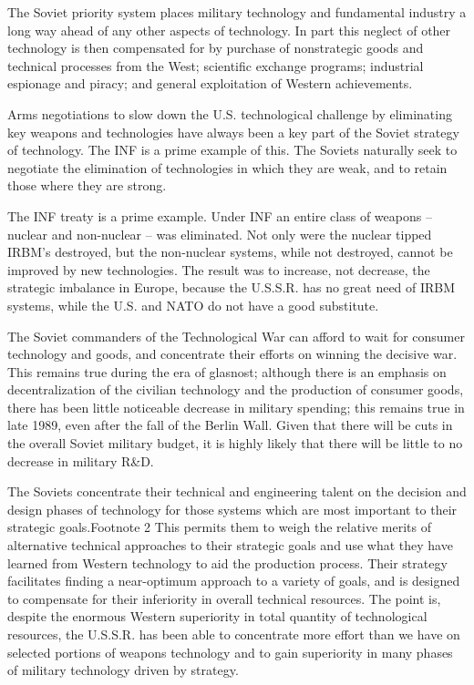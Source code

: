 The Soviet priority system places military technology and fundamental industry a long way ahead of any other aspects of technology. In part this neglect of other technology is then compensated for by purchase of nonstrategic goods and technical processes from the West; scientific exchange programs; industrial espionage and piracy; and general exploitation of Western achievements.

Arms negotiations to slow down the U.S. technological challenge by eliminating key weapons and technologies have always been a key part of the Soviet strategy of technology. The INF is a prime example of this. The Soviets naturally seek to negotiate the elimination of technologies in which they are weak, and to retain those where they are strong.

The INF treaty is a prime example. Under INF an entire class of weapons -- nuclear and non-nuclear -- was eliminated. Not only were the nuclear tipped IRBM's destroyed, but the non-nuclear systems, while not destroyed, cannot be improved by new technologies. The result was to increase, not decrease, the strategic imbalance in Europe, because the U.S.S.R. has no great need of IRBM systems, while the U.S. and NATO do not have a good substitute.

The Soviet commanders of the Technological War can afford to wait for consumer technology and goods, and concentrate their efforts on winning the decisive war. This remains true during the era of glasnost; although there is an emphasis on decentralization of the civilian technology and the production of consumer goods, there has been little noticeable decrease in military spending; this remains true in late 1989, even after the fall of the Berlin Wall. Given that there will be cuts in the overall Soviet military budget, it is highly likely that there will be little to no decrease in military R\&D.

The Soviets concentrate their technical and engineering talent on the decision and design phases of technology for those systems which are most important to their strategic goals.Footnote 2 This permits them to weigh the relative merits of alternative technical approaches to their strategic goals and use what they have learned from Western technology to aid the production process. Their strategy facilitates finding a near-optimum approach to a variety of goals, and is designed to compensate for their inferiority in overall technical resources. The point is, despite the enormous Western superiority in total quantity of technological resources, the U.S.S.R. has been able to concentrate more effort than we have on selected portions of weapons technology and to gain superiority in many phases of military technology driven by strategy.

